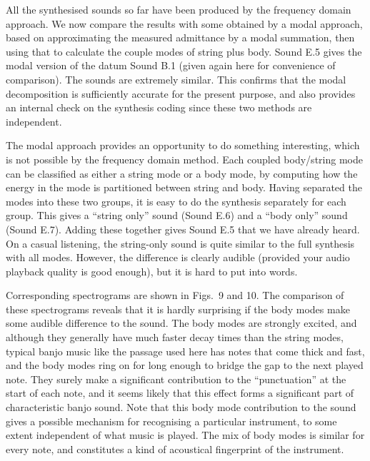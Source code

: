 \audio{}

\audio{}

\audio{}

  All the synthesised sounds so far have been produced by the frequency domain 
  approach. We now compare the results with some obtained by a modal approach, 
  based on approximating the measured admittance by a modal summation, then 
  using that to calculate the couple modes of string plus body. Sound E.5 gives 
  the modal version of the datum Sound B.1 (given again here for convenience of 
  comparison). The sounds are extremely similar. This confirms that the modal 
  decomposition is sufficiently accurate for the present purpose, and also 
  provides an internal check on the synthesis coding since these two methods 
  are independent. 

\audio{}

\audio{}

  The modal approach provides an opportunity to do something interesting, which 
  is not possible by the frequency domain method. Each coupled body/string mode 
  can be classified as either a string mode or a body mode, by computing how 
  the energy in the mode is partitioned between string and body. Having 
  separated the modes into these two groups, it is easy to do the synthesis 
  separately for each group. This gives a ``string only'' sound (Sound E.6) and 
  a ``body only'' sound (Sound E.7). Adding these together gives Sound E.5 that 
  we have already heard. On a casual listening, the string-only sound is quite 
  similar to the full synthesis with all modes. However, the difference is 
  clearly audible (provided your audio playback quality is good enough), but it 
  is hard to put into words. 

\audio{}

\audio{}

  Corresponding spectrograms are shown in Figs.\ 9 and 10. The comparison of 
  these spectrograms reveals that it is hardly surprising if the body modes 
  make some audible difference to the sound. The body modes are strongly 
  excited, and although they generally have much faster decay times than the 
  string modes, typical banjo music like the passage used here has notes that 
  come thick and fast, and the body modes ring on for long enough to bridge the 
  gap to the next played note. They surely make a significant contribution to 
  the ``punctuation'' at the start of each note, and it seems likely that this 
  effect forms a significant part of characteristic banjo sound. Note that this 
  body mode contribution to the sound gives a possible mechanism for 
  recognising a particular instrument, to some extent independent of what music 
  is played. The mix of body modes is similar for every note, and constitutes a 
  kind of acoustical fingerprint of the instrument. 

